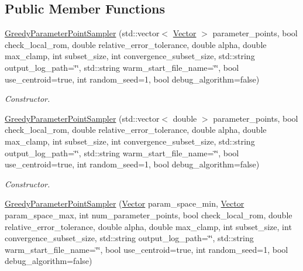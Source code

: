 \subsection*{Public Member Functions}
\begin{DoxyCompactItemize}
\item 
\hyperlink{class_c_a_r_o_m_1_1_greedy_parameter_point_sampler_a8b6b1233f0607ea1758f918f5ba10a25}{Greedy\-Parameter\-Point\-Sampler} (std\-::vector$<$ \hyperlink{class_c_a_r_o_m_1_1_vector}{Vector} $>$ parameter\-\_\-points, bool check\-\_\-local\-\_\-rom, double relative\-\_\-error\-\_\-tolerance, double alpha, double max\-\_\-clamp, int subset\-\_\-size, int convergence\-\_\-subset\-\_\-size, std\-::string output\-\_\-log\-\_\-path=\char`\"{}\char`\"{}, std\-::string warm\-\_\-start\-\_\-file\-\_\-name=\char`\"{}\char`\"{}, bool use\-\_\-centroid=true, int random\-\_\-seed=1, bool debug\-\_\-algorithm=false)
\begin{DoxyCompactList}\small\item\em Constructor. \end{DoxyCompactList}\item 
\hyperlink{class_c_a_r_o_m_1_1_greedy_parameter_point_sampler_a65d207011c1e657383296706bf607363}{Greedy\-Parameter\-Point\-Sampler} (std\-::vector$<$ double $>$ parameter\-\_\-points, bool check\-\_\-local\-\_\-rom, double relative\-\_\-error\-\_\-tolerance, double alpha, double max\-\_\-clamp, int subset\-\_\-size, int convergence\-\_\-subset\-\_\-size, std\-::string output\-\_\-log\-\_\-path=\char`\"{}\char`\"{}, std\-::string warm\-\_\-start\-\_\-file\-\_\-name=\char`\"{}\char`\"{}, bool use\-\_\-centroid=true, int random\-\_\-seed=1, bool debug\-\_\-algorithm=false)
\begin{DoxyCompactList}\small\item\em Constructor. \end{DoxyCompactList}\item 
\hyperlink{class_c_a_r_o_m_1_1_greedy_parameter_point_sampler_a0a493105a7b66e9cb7d57c741a875e9e}{Greedy\-Parameter\-Point\-Sampler} (\hyperlink{class_c_a_r_o_m_1_1_vector}{Vector} param\-\_\-space\-\_\-min, \hyperlink{class_c_a_r_o_m_1_1_vector}{Vector} param\-\_\-space\-\_\-max, int num\-\_\-parameter\-\_\-points, bool check\-\_\-local\-\_\-rom, double relative\-\_\-error\-\_\-tolerance, double alpha, double max\-\_\-clamp, int subset\-\_\-size, int convergence\-\_\-subset\-\_\-size, std\-::string output\-\_\-log\-\_\-path=\char`\"{}\char`\"{}, std\-::string warm\-\_\-start\-\_\-file\-\_\-name=\char`\"{}\char`\"{}, bool use\-\_\-centroid=true, int random\-\_\-seed=1, bool debug\-\_\-algorithm=false)

\end{DoxyCompactItemize}
